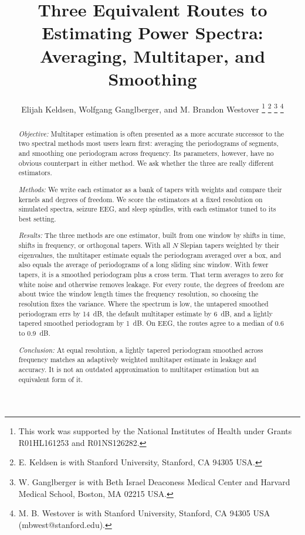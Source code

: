 \documentclass[10pt,twocolumn]{article}
\begin{document}
\title{Three Equivalent Routes to Estimating Power Spectra: Averaging, Multitaper, and Smoothing}
\author{Elijah Keldsen, Wolfgang Ganglberger, and M. Brandon Westover
\thanks{This work was supported by the National Institutes of Health under Grants R01HL161253 and R01NS126282.}
\thanks{E. Keldsen is with Stanford University, Stanford, CA 94305 USA.}
\thanks{W. Ganglberger is with Beth Israel Deaconess Medical Center and Harvard Medical School, Boston, MA 02215 USA.}
\thanks{M. B. Westover is with Stanford University, Stanford, CA 94305 USA (mbwest@stanford.edu).}}

\date{}
\maketitle

\begin{abstract}
\textit{Objective:} Multitaper estimation is often presented as a more accurate successor to the two spectral methods most users learn first: averaging the periodograms of segments, and smoothing one periodogram across frequency. Its parameters, however, have no obvious counterpart in either method. We ask whether the three are really different estimators.

\textit{Methods:} We write each estimator as a bank of tapers with weights and compare their kernels and degrees of freedom. We score the estimators at a fixed resolution on simulated spectra, seizure EEG, and sleep spindles, with each estimator tuned to its best setting.

\textit{Results:} The three methods are one estimator, built from one window by shifts in time, shifts in frequency, or orthogonal tapers. With all $N$ Slepian tapers weighted by their eigenvalues, the multitaper estimate equals the periodogram averaged over a box, and also equals the average of periodograms of a long sliding sinc window. With fewer tapers, it is a smoothed periodogram plus a cross term. That term averages to zero for white noise and otherwise removes leakage. For every route, the degrees of freedom are about twice the window length times the frequency resolution, so choosing the resolution fixes the variance. Where the spectrum is low, the untapered smoothed periodogram errs by 14~dB, the default multitaper estimate by 6~dB, and a lightly tapered smoothed periodogram by 1~dB. On EEG, the routes agree to a median of 0.6 to 0.9~dB.

\textit{Conclusion:} At equal resolution, a lightly tapered periodogram smoothed across frequency matches an adaptively weighted multitaper estimate in leakage and accuracy. It is not an outdated approximation to multitaper estimation but an equivalent form of it.


\end{abstract}
\end{document}

